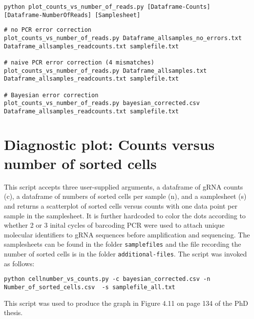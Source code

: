 \begin{small}\begin{lstlisting}
python plot_counts_vs_number_of_reads.py [Dataframe-Counts] [Dataframe-NumberOfReads] [Samplesheet]
\end{lstlisting}\end{small}

\begin{small}\begin{lstlisting}
# no PCR error correction
plot_counts_vs_number_of_reads.py Dataframe_allsamples_no_errors.txt Dataframe_allsamples_readcounts.txt samplefile.txt

# naive PCR error correction (4 mismatches)
plot_counts_vs_number_of_reads.py Dataframe_allsamples.txt Dataframe_allsamples_readcounts.txt samplefile.txt

# Bayesian error correction
plot_counts_vs_number_of_reads.py bayesian_corrected.csv Dataframe_allsamples_readcounts.txt samplefile.txt
\end{lstlisting}\end{small}

\section{Diagnostic plot: Counts versus number of sorted cells}

This script accepts three user-supplied arguments, a dataframe of gRNA counts (c), a dataframe of numbers of sorted cells per sample (n), and a samplesheet (s) and returns a scatterplot of sorted cells versus counts with one data point per sample in the samplesheet. It is further hardcoded to color the dots according to whether 2 or 3 inital cycles of barcoding PCR were used to attach unique molecular identifiers to gRNA sequences before amplification and sequencing. The samplesheets can be found in the folder \verb|samplefiles| and the file recording the number of sorted cells is in the folder \verb|additional-files|. The script was invoked as follows:

\begin{small}\begin{lstlisting}
python cellnumber_vs_counts.py -c bayesian_corrected.csv -n Number_of_sorted_cells.csv  -s samplefile_all.txt 
\end{lstlisting}\end{small}

This script was used to produce the graph in Figure 4.11 on page 134 of the PhD thesis.


